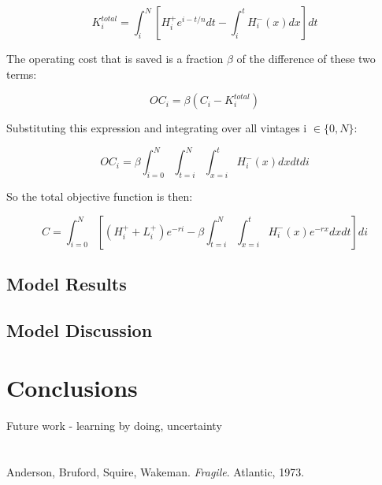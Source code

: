 \documentclass[singlespace]{easychithesis}
\begin{document}
\begin{equation}
K^{total}_i = \int_i^N \left[H^+_i e^{i-t/n} dt - \int_i^t H^-_i(x)dx \right] dt
\end{equation}

The operating cost that is saved is a fraction $\beta$ of the difference of these two terms:

\begin{equation}
OC_i = \beta (C_i - K^{total}_i)
\end{equation}


Substituting this expression and integrating over all vintages  i $\in \{0,N\}$:

\begin{equation}
OC_i = \beta \int_{i=0}^N \int_{t=i}^N \int_{x=i}^t H^-_i(x) dx dt di
\end{equation}

So the total objective function is then:

\begin{equation}
C = \int_{i=0}^N  \left[ (H^+_i + L^+_i)e^{-ri}  - \beta  \int_{t=i}^N \int_{x=i}^t H^-_i(x)e^{-rx} dx dt\right] di
\end{equation}






\section{Model Results}

\section{Model Discussion}



\chapter{Conclusions}

Future work - learning by doing, uncertainty


%
%
\appendix
\chapter{}

\chapter{}



\singlespacing
\pagebreak
{}

\begin{thebibliography}{99}
Anderson, Bruford, Squire, Wakeman.  \emph{Fragile}.
  Atlantic, 1973.
\end{thebibliography}
\end{document}
